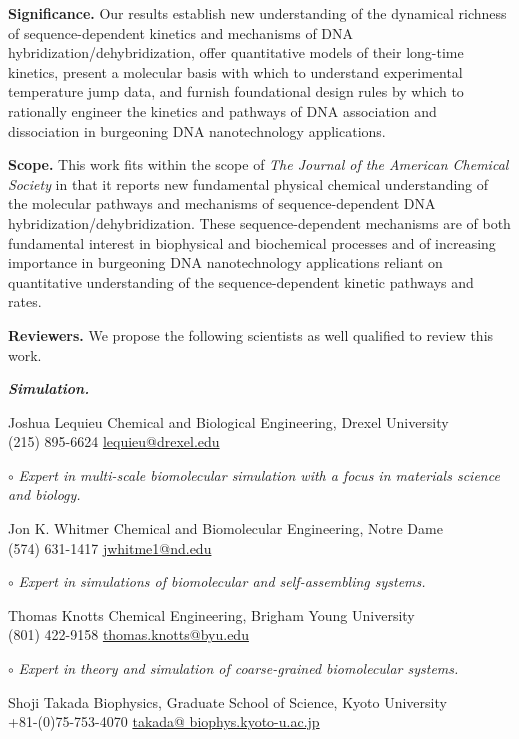 \documentclass[11pt,a4paper]{letter} %
\begin{document}
\begin{letter}
\textbf{Significance.} Our results establish new understanding of the dynamical richness of sequence-dependent kinetics and mechanisms of DNA hybridization/dehybridization, offer quantitative models of their long-time kinetics, present a molecular basis with which to understand experimental temperature jump data, and furnish foundational design rules by which to rationally engineer the kinetics and pathways of DNA association and dissociation in burgeoning DNA nanotechnology applications.

\textbf{Scope.}  This work fits within the scope of \textit{The Journal of the American Chemical Society} in that it reports new fundamental physical chemical understanding of the molecular pathways and mechanisms of sequence-dependent DNA hybridization/dehybridization. These sequence-dependent mechanisms are of both fundamental interest in biophysical and biochemical processes and of increasing importance in burgeoning DNA nanotechnology applications reliant on quantitative understanding of the sequence-dependent kinetic pathways and rates.


\textbf{Reviewers.} We propose the following scientists as well qualified to review this work.

\textbf{\textit{Simulation.}}

Joshua Lequieu \hfill Chemical and Biological Engineering, Drexel University \\
(215) 895-6624 \hfill \url{lequieu@drexel.edu}

$\circ$ \textit{Expert in multi-scale biomolecular simulation with a focus in materials science and biology.}

Jon K. Whitmer \hfill Chemical and Biomolecular Engineering, Notre Dame \\
(574) 631-1417 \hfill \url{jwhitme1@nd.edu}

$\circ$ \textit{Expert in simulations of biomolecular and self-assembling systems.}

Thomas Knotts \hfill Chemical Engineering, Brigham Young University \\
(801) 422-9158 \hfill \url{thomas.knotts@byu.edu}

$\circ$ \textit{Expert in theory and simulation of coarse-grained biomolecular systems.}

Shoji Takada \hfill Biophysics, Graduate School of Science, Kyoto University \\
+81-(0)75-753-4070 \hfill \url{takada@ biophys.kyoto-u.ac.jp}


\end{letter}
\end{document}
